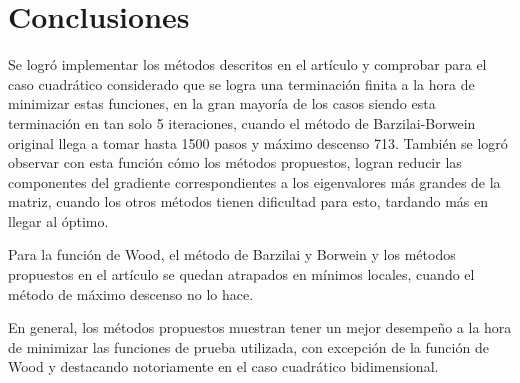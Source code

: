 \section*{Conclusiones}

Se logró implementar los métodos descritos en el artículo y comprobar para el caso cuadrático considerado  que se logra una terminación finita a la hora de minimizar estas funciones, en la gran mayoría de los casos siendo esta terminación en tan solo 5 iteraciones, cuando el método de Barzilai-Borwein original llega a tomar hasta 1500 pasos y máximo descenso 713.  También se logró observar con esta función cómo los métodos propuestos, logran reducir las componentes del gradiente correspondientes a los eigenvalores más grandes de la matriz, cuando los otros métodos tienen dificultad para esto, tardando más en llegar al óptimo.
\par Para la función de Wood, el método de Barzilai y Borwein y los métodos propuestos en el artículo se quedan atrapados en mínimos locales, cuando el método de máximo descenso no lo hace.
\par En general, los métodos propuestos muestran tener un mejor desempeño a la hora de minimizar las funciones de prueba utilizada, con excepción de la función de Wood y destacando notoriamente en el caso cuadrático bidimensional.
